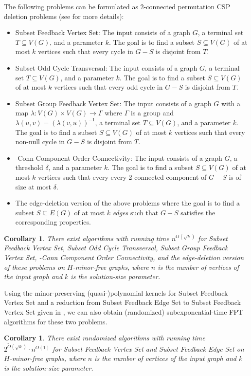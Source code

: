 \documentclass[a4paper,11pt]{article}
\numberwithin{lemma}{section}
\newtheorem{corollary}[lemma]{Corollary}
\begin{document}
The following problems can be formulated as 2-connected permutation CSP deletion problems (see \cite{MarxMNT22} for more details):
\begin{itemize}
 \item {\sc Subset Feedback Vertex Set}: The input consists of a graph $G$, a terminal set $T \subseteq V(G)$, and a parameter $k$.
 The goal is to find a subset $S \subseteq V(G)$ of at most $k$ vertices such that every cycle in $G - S$ is disjoint from $T$.
 \item {\sc Subset Odd Cycle Transversal}: The input consists of a graph $G$, a terminal set $T \subseteq V(G)$, and a parameter $k$. The goal is to find a subset $S \subseteq V(G)$ of at most $k$ vertices such that every odd cycle in $G - S$ is disjoint from $T$.
 \item {\sc Subset Group Feedback Vertex Set}: The input consists of a graph $G$ with a map $\lambda\colon V(G) \times V(G) \rightarrow \varGamma$ where $\varGamma$ is a group and $\lambda(u,v) = (\lambda(v,u))^{-1}$, a terminal set $T \subseteq V(G)$, and a parameter $k$. The goal is to find a subset $S \subseteq V(G)$ of at most $k$ vertices such that every non-null cycle in $G - S$ is disjoint from $T$.
 \item {-Conn Component Order Connectivity}:  The input consists of a graph $G$, a threshold $\delta$, and a parameter $k$. The goal is to find a subset $S \subseteq V(G)$ of at most $k$ vertices such that every every 2-connected component of $G-S$ is of size at most $\delta$.
 \item The edge-deletion version of the above problems where the goal is to find a subset $S \subseteq E(G)$ of at most $k$ \emph{edges} such that $G-S$ satisfies the corresponding properties.
\end{itemize}

\begin{corollary}
 There exist algorithms with running time $n^{O(\sqrt{k})}$ for {\sc Subset Feedback Vertex Set}, {\sc Subset Odd Cycle Transversal}, {\sc Subset Group Feedback Vertex Set}, {-Conn Component Order Connectivity}, and the edge-deletion version of these problems on $H$-minor-free graphs, where $n$ is the number of vertices of the input graph and $k$ is the solution-size parameter.
\end{corollary}

Using the minor-preserving (quasi-)polynomial kernels for {\sc Subset Feedback Vertex Set} and a reduction from {\sc Subset Feedback Edge Set} to  {\sc Subset Feedback Vertex Set} given in \cite{MarxMNT22}, we can also obtain (randomized) subexponential-time FPT algorithms for these two problems.

\begin{corollary}
 There exist randomized algorithms with running time $2^{\widetilde{O}(\sqrt{k})} \cdot n^{O(1)}$ for {\sc Subset Feedback Vertex Set} and {\sc Subset Feedback Edge Set} on $H$-minor-free graphs, where $n$ is the number of vertices of the input graph and $k$ is the solution-size parameter.
\end{corollary}
 



\end{document}
